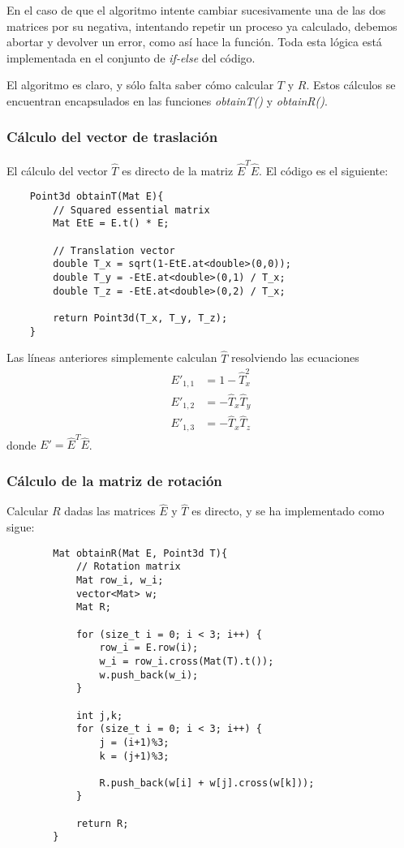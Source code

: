 \documentclass[a4paper, 11pt]{article}
\theoremstyle{definition}
\theoremstyle{theorem}
\begin{document}
    En el caso de que el algoritmo intente cambiar sucesivamente una de las dos matrices por su negativa, intentando repetir un proceso ya calculado, debemos abortar y devolver un error, como así hace la función. Toda esta lógica está implementada en el conjunto de \emph{if-else} del código.

    El algoritmo es claro, y sólo falta saber cómo calcular $T$ y $R$. Estos cálculos se encuentran encapsulados en las funciones \emph{obtainT()} y \emph{obtainR()}.

    \subsubsection{Cálculo del vector de traslación}
    El cálculo del vector $\hat{T}$ es directo de la matriz $\hat{E}^T\hat{E}$. El código es el siguiente:
    \begin{lstlisting}
    Point3d obtainT(Mat E){
        // Squared essential matrix
        Mat EtE = E.t() * E;

        // Translation vector
        double T_x = sqrt(1-EtE.at<double>(0,0));
        double T_y = -EtE.at<double>(0,1) / T_x;
        double T_z = -EtE.at<double>(0,2) / T_x;

        return Point3d(T_x, T_y, T_z);
    }
    \end{lstlisting}

    Las líneas anteriores simplemente calculan $\hat{T}$ resolviendo las ecuaciones
    \begin{align*}
        E'_{1,1} &= 1 - \hat{T}_x^2 \\
        E'_{1,2} &= -\hat{T}_x\hat{T}_y \\
        E'_{1,3} &= -\hat{T}_x\hat{T}_z
    \end{align*}
    donde $E'=\hat{E}^T\hat{E}$.

    \subsubsection{Cálculo de la matriz de rotación}
    Calcular $R$ dadas las matrices $\hat{E}$ y $\hat{T}$ es directo, y se ha implementado como sigue:
    \begin{lstlisting}
        Mat obtainR(Mat E, Point3d T){
            // Rotation matrix
            Mat row_i, w_i;
            vector<Mat> w;
            Mat R;

            for (size_t i = 0; i < 3; i++) {
                row_i = E.row(i);
                w_i = row_i.cross(Mat(T).t());
                w.push_back(w_i);
            }

            int j,k;
            for (size_t i = 0; i < 3; i++) {
                j = (i+1)%3;
                k = (j+1)%3;

                R.push_back(w[i] + w[j].cross(w[k]));
            }

            return R;
        }
    \end{lstlisting}
\end{document}
